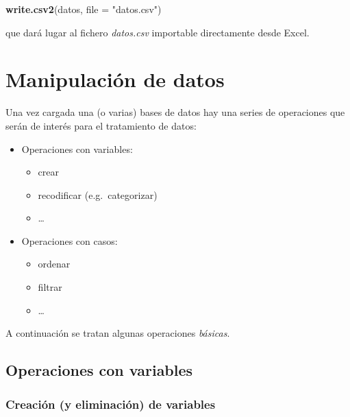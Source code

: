 \documentclass[]{book}
\newenvironment{Shaded}{\begin{snugshade}}{\end{snugshade}}
\newcommand{\DataTypeTok}[1]{\textcolor[rgb]{0.13,0.29,0.53}{#1}}
\newcommand{\KeywordTok}[1]{\textcolor[rgb]{0.13,0.29,0.53}{\textbf{#1}}}
\newcommand{\NormalTok}[1]{#1}
\newcommand{\StringTok}[1]{\textcolor[rgb]{0.31,0.60,0.02}{#1}}
\providecommand{\tightlist}{%
  \setlength{\itemsep}{0pt}\setlength{\parskip}{0pt}}
\begin{document}
\begin{Shaded}
\begin{Highlighting}[]
\KeywordTok{write.csv2}\NormalTok{(datos, }\DataTypeTok{file =} \StringTok{"datos.csv"}\NormalTok{)}
\end{Highlighting}
\end{Shaded}

que dará lugar al fichero \emph{datos.csv} importable directamente desde Excel.

\hypertarget{manipulacion-de-datos}{%
\section{Manipulación de datos}\label{manipulacion-de-datos}}

Una vez cargada una (o varias) bases
de datos hay una series de operaciones que serán de interés para el
tratamiento de datos:

\begin{itemize}
\tightlist
\item
  Operaciones con variables:

  \begin{itemize}
  \tightlist
  \item
    crear
  \item
    recodificar (e.g.~categorizar)
  \item
    \ldots{}
  \end{itemize}
\item
  Operaciones con casos:

  \begin{itemize}
  \tightlist
  \item
    ordenar
  \item
    filtrar
  \item
    \ldots{}
  \end{itemize}
\end{itemize}

A continuación se tratan algunas operaciones \emph{básicas}.

\hypertarget{operaciones-con-variables}{%
\subsection{Operaciones con variables}\label{operaciones-con-variables}}

\hypertarget{creacion-y-eliminacion-de-variables}{%
\subsubsection{Creación (y eliminación) de variables}\label{creacion-y-eliminacion-de-variables}}
\end{document}
